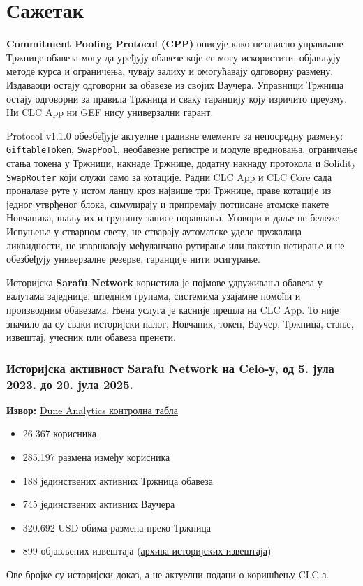\documentclass[11pt]{article}
\begin{document}
\section*{Сажетак}

\textbf{Commitment Pooling Protocol (CPP)} описује како независно управљане Тржнице обавеза могу да уређују обавезе које се могу искористити, објављују методе курса и ограничења, чувају залиху и омогућавају одговорну размену. Издаваоци остају одговорни за обавезе из својих Ваучера. Управници Тржница остају одговорни за правила Тржница и сваку гаранцију коју изричито преузму. Ни CLC App ни GEF нису универзални гарант.

Protocol v1.1.0 обезбеђује актуелне градивне елементе за непосредну размену: \texttt{GiftableToken}, \texttt{SwapPool}, необавезне регистре и модуле вредновања, ограничење стања токена у Тржници, накнаде Тржнице, додатну накнаду протокола и Solidity \texttt{SwapRouter} који служи само за котације. Радни CLC App и CLC Core сада проналазе руте у истом ланцу кроз највише три Тржнице, праве котације из једног утврђеног блока, симулирају и припремају потписане атомске пакете Новчаника, шаљу их и групишу записе поравнања. Уговори и даље не бележе Испуњење у стварном свету, не стварају аутоматске уделе пружалаца ликвидности, не извршавају међуланчано рутирање или пакетно нетирање и не обезбеђују универзалне резерве, гаранције нити осигурање.

Историјска \textbf{Sarafu Network} користила је појмове удруживања обавеза у валутама заједнице, штедним групама, системима узајамне помоћи и производним обавезама. Њена услуга је касније прешла на CLC App. То није значило да су сваки историјски налог, Новчаник, токен, Ваучер, Тржница, стање, извештај, учесник или обавеза пренети.

\subsubsection*{Историјска активност Sarafu Network на Celo-у, од 5. јула 2023. до 20. јула 2025.}

\textbf{Извор:} \href{https://dune.com/grassrootseconomics/sarafu-network}{Dune Analytics контролна табла}

\begin{itemize}[leftmargin=*]
\item 26.367 корисника
\item 285.197 размена између корисника
\item 188 јединствених активних Тржница обавеза
\item 745 јединствених активних Ваучера
\item 320.692 USD обима размена преко Тржница
\item 899 објављених извештаја (\href{https://sarafu.network/reports}{архива историјских извештаја})
\end{itemize}
Ове бројке су историјски доказ, а не актуелни подаци о коришћењу CLC-а.
\end{document}
